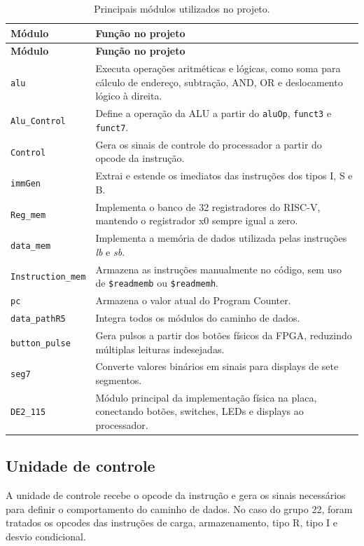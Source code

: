 \documentclass[12pt,a4paper]{article}
\begin{document}
\begin{longtable}{>{\raggedright\arraybackslash}p{4cm} >{\raggedright\arraybackslash}p{10cm}}
\caption{Principais módulos utilizados no projeto.}\label{tab:modulos}\\
\toprule
\textbf{Módulo} & \textbf{Função no projeto} \\
\midrule
\endfirsthead
\toprule
\textbf{Módulo} & \textbf{Função no projeto} \\
\midrule
\endhead
\texttt{alu} & Executa operações aritméticas e lógicas, como soma para cálculo de endereço, subtração, AND, OR e deslocamento lógico à direita. \\
\texttt{Alu\_Control} & Define a operação da ALU a partir do \texttt{aluOp}, \texttt{funct3} e \texttt{funct7}. \\
\texttt{Control} & Gera os sinais de controle do processador a partir do opcode da instrução. \\
\texttt{immGen} & Extrai e estende os imediatos das instruções dos tipos I, S e B. \\
\texttt{Reg\_mem} & Implementa o banco de 32 registradores do RISC-V, mantendo o registrador x0 sempre igual a zero. \\
\texttt{data\_mem} & Implementa a memória de dados utilizada pelas instruções \textit{lb} e \textit{sb}. \\
\texttt{Instruction\_mem} & Armazena as instruções manualmente no código, sem uso de \texttt{\$readmemb} ou \texttt{\$readmemh}. \\
\texttt{pc} & Armazena o valor atual do Program Counter. \\
\texttt{data\_pathR5} & Integra todos os módulos do caminho de dados. \\
\texttt{button\_pulse} & Gera pulsos a partir dos botões físicos da FPGA, reduzindo múltiplas leituras indesejadas. \\
\texttt{seg7} & Converte valores binários em sinais para displays de sete segmentos. \\
\texttt{DE2\_115} & Módulo principal da implementação física na placa, conectando botões, switches, LEDs e displays ao processador. \\
\bottomrule
\end{longtable}

\subsection{Unidade de controle}

A unidade de controle recebe o opcode da instrução e gera os sinais necessários para definir o comportamento do caminho de dados. No caso do grupo 22, foram tratados os opcodes das instruções de carga, armazenamento, tipo R, tipo I e desvio condicional.
\end{document}
